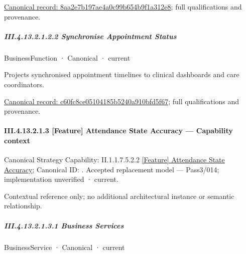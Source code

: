{\footnotesize \href{../../../../continuum/business/business-function/8aa2e7b197ae4a0c99b654b9f1a312e8.md}{Canonical record: 8aa2e7b197ae4a0c99b654b9f1a312e8}; full qualifications and provenance.}\par
\subparagraph*{III.4.13.2.1.2.2 Synchronise Appointment Status}
\label{navigation:III.4.13.2.1.2.2}

\label{element:c60fc8ce05104185b5240a910bfd5f67}
{\small BusinessFunction · Canonical · current}\par

Projects synchronised appointment timelines to clinical dashboards and care coordinators.


{\footnotesize \href{../../../../continuum/business/business-function/c60fc8ce05104185b5240a910bfd5f67.md}{Canonical record: c60fc8ce05104185b5240a910bfd5f67}; full qualifications and provenance.}\par
\paragraph*{III.4.13.2.1.3 [Feature] Attendance State Accuracy — Capability context}
\label{navigation:III.4.13.2.1.3}

{\small Canonical Strategy Capability: II.1.1.7.5.2.2 \hyperref[element:9fd06e573a6144b9a43ecebc8ead3baf]{[Feature] Attendance State Accuracy}; Canonical ID: \texttt{}. Accepted replacement model — Pass3/014; implementation unverified · current.}\par
Contextual reference only; no additional architectural instance or semantic relationship.\par
\subparagraph*{III.4.13.2.1.3.1 Business Services}
\label{navigation:III.4.13.2.1.3.1}

\label{navigation:III.4.13.2.1.3.1.1}

\label{element:c720457349e644179c98d13be59bd581}
{\small BusinessService · Canonical · current}\par

